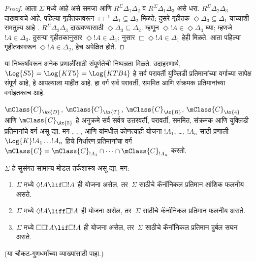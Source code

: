 \documentclass[../../../include/open-logic-section]{subfiles}
\begin{document}
\begin{proof}
  आता $\Sigma$ मध्ये  आहे
  असे समजा आणि $R^\Sigma
  \Delta_1\Delta_2$ व
  $R^\Sigma \Delta_1\Delta_3$
  असे धरा. $R^\Sigma
  \Delta_2\Delta_3$ दाखवायचे आहे.
  पहिल्या गृहीतकावरून
  $\Box^{-1}\Delta_1 \subseteq \Delta_2$
  मिळते; दुसरे गृहीतक
  $\Diamond\Delta_3 \subseteq \Delta_1$
  याच्याशी समतुल्य आहे
  .
  $R^\Sigma \Delta_2\Delta_3$
  दाखवण्यासाठी 
  $\Diamond\Delta_3 \subseteq \Delta_2$.
  म्हणून $\Diamond!A \in
  \Diamond\Delta_3$ घ्या;
  म्हणजे $!A \in \Delta_3$.
  दुसऱ्या गृहीतकानुसार
  $\Diamond!A \in \Delta_1$;
   नुसार
  $\Box\Diamond!A \in \Delta_1$
  हेही मिळते. आता पहिल्या
  गृहीतकावरून $\Diamond!A \in
  \Delta_2$, हेच अपेक्षित होते.
  \end{proof}

या निष्कर्षांवरून अनेक प्रणालींसाठी
संपूर्णतेची निष्पन्नता मिळते.
उदाहरणार्थ, $\Log{S5} = \Log{KT5} =
\Log{KTB4}$ हे सर्व परावर्ती युक्लिडी
प्रतिमानांच्या वर्गाच्या सापेक्ष संपूर्ण
आहे, हे आपल्याला माहीत आहे.
हा वर्ग सर्व परावर्ती, सममित आणि
संक्रमक प्रतिमानांच्या वर्गाइतकाच आहे.

\begin{thm}
  $\mClass{C}_\Ax{D}$,
  $\mClass{C}_\Ax{T}$,
  $\mClass{C}_\Ax{B}$,
  $\mClass{C}_\Ax{4}$ आणि
  $\mClass{C}_\Ax{5}$
  हे अनुक्रमे सर्व सर्वत्र उत्तरवर्ती,
  परावर्ती, सममित, संक्रमक आणि
  युक्लिडी प्रतिमानांचे वर्ग असू द्या.
  मग , , ,
   आणि  यांमधील
  कोणत्याही योजना $!A_1$, \dots, $!A_n$
  साठी प्रणाली
  $\Log{K}!A_1 \dots !A_n$
  हिचे निर्धारण प्रतिमानांचा वर्ग
  $\mClass{C} = \mClass{C}_{!A_1} \cap \dots
  \cap \mClass{C}_{!A_n}$ करतो.
\end{thm}

\begin{prop}
  $\Sigma$ हे सुसंगत सामान्य मोडल तर्कशास्त्र
  असू द्या. मग:
  \begin{enumerate}
  \item{}%
    $\Sigma$ मध्ये $\Diamond!A \lif \Box
    !A$ ही योजना असेल, तर~$\Sigma$
    साठीचे कॅनॉनिकल प्रतिमान
    आंशिक फलनीय असते.
  \item $\Sigma$ मध्ये
    $\Diamond!A \liff \Box
    !A$ ही योजना असेल, तर~$\Sigma$
    साठीचे कॅनॉनिकल प्रतिमान
    फलनीय असते.
  \item $\Sigma$ मध्ये
    $\Box\Box!A \lif \Box
    !A$ ही योजना असेल, तर~$\Sigma$
    साठीचे कॅनॉनिकल प्रतिमान
    दुर्बल सघन असते.
  \end{enumerate}
  (या चौकट-गुणधर्मांच्या व्याख्यांसाठी
   पाहा.)
\end{prop}
\end{document}
